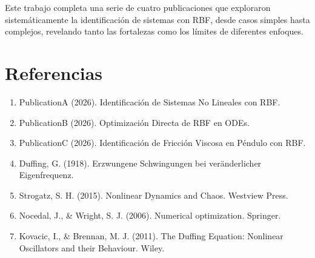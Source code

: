 \documentclass[11pt,a4paper]{article}
\begin{document}
Este trabajo completa una serie de cuatro publicaciones que exploraron sistemáticamente la identificación de sistemas con RBF, desde casos simples hasta complejos, revelando tanto las fortalezas como los límites de diferentes enfoques.

\section*{Referencias}

\begin{enumerate}
\item PublicationA (2026). Identificación de Sistemas No Lineales con RBF.
\item PublicationB (2026). Optimización Directa de RBF en ODEs.
\item PublicationC (2026). Identificación de Fricción Viscosa en Péndulo con RBF.
\item Duffing, G. (1918). Erzwungene Schwingungen bei veränderlicher Eigenfrequenz.
\item Strogatz, S. H. (2015). Nonlinear Dynamics and Chaos. Westview Press.
\item Nocedal, J., \& Wright, S. J. (2006). Numerical optimization. Springer.
\item Kovacic, I., \& Brennan, M. J. (2011). The Duffing Equation: Nonlinear Oscillators and their Behaviour. Wiley.
\end{enumerate}
\end{document}
